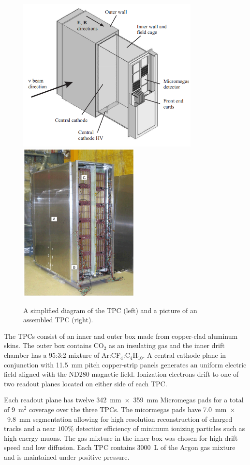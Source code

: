 \begin{figure}[h]
\begin{center}
\includegraphics[width=3.6in]{./Figures/tpc1.png}
\includegraphics[width=2.4in]{./Figures/tpc2.png}
\end{center}
\caption{A simplified diagram of the TPC (left) and a picture of an
  assembled TPC (right).}
\label{fig:tpc}
\end{figure}

The TPCs consist of an inner and outer box made from copper-clad
aluminum skins. The outer box contains CO$_2$ as an insulating gas and
the inner drift chamber has a 95:3:2 mixture of
Ar:CF$_4$:C$_4$H$_{10}$. A central cathode plane in conjunction with
11.5~mm pitch copper-strip panels generates an uniform
electric field aligned with the ND280 magnetic field. Ionization
electrons drift to one of two readout planes located on either side of
each TPC. 

Each readout plane has twelve 342~mm~$\times$~359~mm Micromegas pads for a
total of 9~m$^2$ coverage over the three TPCs. The micormegas pads
have 7.0~mm~$\times$~9.8~mm segmentation allowing for high resolution
reconstruction of charged tracks and a near $100\%$ detectior
efficiency of minimum ionizing particles such as high energy
muons. The gas mixture in the inner box was chosen for high drift speed and low
diffusion. Each TPC contains 3000~L of the Argon gas mixture and is
maintained under positive pressure.

